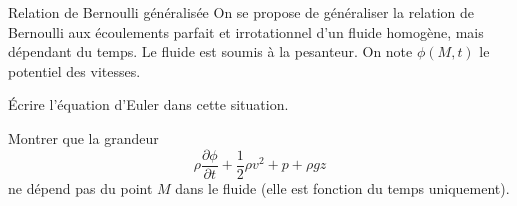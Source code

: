 \begin{exo}[PC][2][TD]{Relation de Bernoulli généralisée}
On se propose de généraliser la relation de Bernoulli aux écoulements parfait et irrotationnel d’un fluide homogène, mais dépendant du temps. Le fluide est soumis à la pesanteur.
On note $\phi(M,t)$ le potentiel des vitesses.

\begin{quest}
  \item Écrire l’équation d’Euler dans cette situation.


\item Montrer que la grandeur
$$
\rho\dfrac{\partial \phi}{\partial t} + \dfrac{1}{2}\rho v^{2} + p+ \rho g z
$$
ne dépend pas du point $M$ dans le fluide (elle est fonction du temps uniquement).



\end{quest}
\end{exo}
